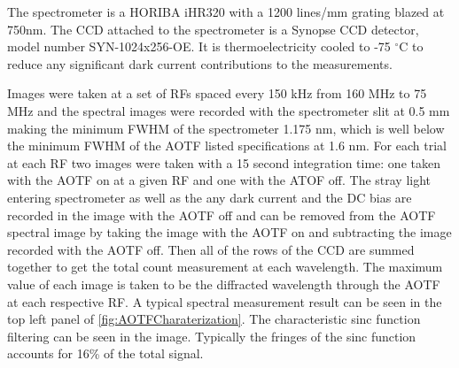 

The spectrometer is a HORIBA iHR320 with a 1200 lines/mm grating blazed at 750nm. The CCD attached to the spectrometer is a Synopse CCD detector, model number SYN-1024x256-OE. It is thermoelectricity cooled to -75 $^{\circ}$C to reduce any significant dark current contributions to the measurements.

Images were taken at a set of RFs spaced every 150 kHz from 160 MHz to 75 MHz and the spectral images were recorded with the spectrometer slit at 0.5 mm making the minimum FWHM of the spectrometer 1.175 nm, which is well below the minimum FWHM of the AOTF listed specifications at 1.6 nm. For each trial at each RF two images were taken with a 15 second integration time: one taken with the AOTF on at a given RF and one with the ATOF off. The stray light entering spectrometer as well as the any dark current and the DC bias are recorded in the image with the AOTF off and can be removed from the AOTF spectral image by taking the image with the AOTF on and subtracting the image recorded with the AOTF off. Then all of the rows of the CCD are summed together to get the total count measurement at each wavelength. The maximum value of each image is taken to be the diffracted wavelength through the AOTF at each respective RF. A typical spectral measurement result can be seen in the top left panel of \autoref{fig:AOTFCharaterization}. The characteristic sinc function filtering can be seen in the image. Typically the fringes of the sinc function accounts for 16\% of the total signal.

